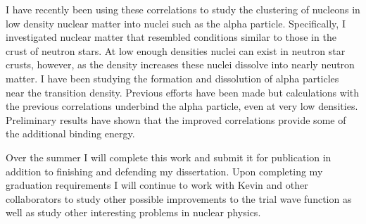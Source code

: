 \documentclass[12pt]{article}
\begin{document}
I have recently been using these correlations to study the clustering of nucleons in low density nuclear matter into nuclei such as the alpha particle. Specifically, I investigated nuclear matter that resembled conditions similar to those in the crust of neutron stars. At low enough densities nuclei can exist in neutron star crusts, however, as the density increases these nuclei dissolve into nearly neutron matter. I have been studying the formation and dissolution of alpha particles near the transition density. Previous efforts have been made but calculations with the previous correlations underbind the alpha particle, even at very low densities. Preliminary results have shown that the improved correlations provide some of the additional binding energy.

Over the summer I will complete this work and submit it for publication in addition to finishing and defending my dissertation. Upon completing my graduation requirements I will continue to work with Kevin and other collaborators to study other possible improvements to the trial wave function as well as study other interesting problems in nuclear physics.
\end{document}
